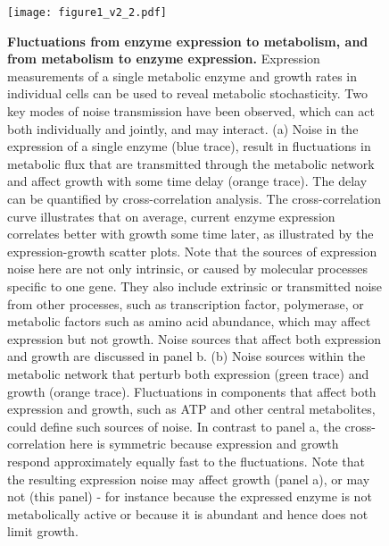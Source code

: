 \begin{figure}
    \centering
    \texttt{[image: figure1\_v2\_2.pdf]}
    \caption{ 
        \textbf{Fluctuations from enzyme expression to metabolism, and from metabolism to enzyme expression.}           
        Expression measurements of a single metabolic enzyme and growth rates in individual cells can be used to reveal metabolic stochasticity. Two key modes of noise transmission have been observed, which can act both individually and jointly, and may interact. (a) Noise in the expression of a single enzyme (blue trace), result in fluctuations in metabolic flux that are transmitted through the metabolic network and affect growth with some time delay (orange trace). The delay can be quantified by cross-correlation analysis. The cross-correlation curve illustrates that on average, current enzyme expression correlates better with growth some time later, as illustrated by the expression-growth scatter plots. Note that the sources of expression noise here are not only intrinsic, or caused by molecular processes specific to one gene. They also include extrinsic or transmitted noise from other processes, such as transcription factor, polymerase, or metabolic factors such as amino acid abundance, which may affect expression but not growth.  Noise sources that affect both expression and growth are discussed in panel b.  (b) Noise sources within the metabolic network that perturb both expression (green trace) and growth (orange trace). Fluctuations in components that affect both expression and growth, such as ATP and other central metabolites, could define such sources of noise. In contrast to panel a, the cross-correlation here is symmetric because expression and growth respond approximately equally fast to the fluctuations. Note that the resulting expression noise may affect growth (panel a), or may not (this panel) - for instance because the expressed enzyme is not metabolically active or because it is abundant and hence does not limit growth.             
    }
    \label{fig:literature:fig1}
\end{figure}

